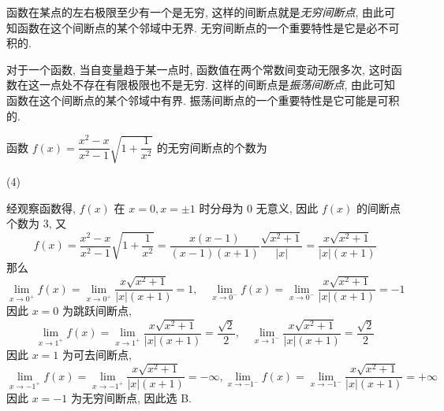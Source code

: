 \begin{definition}[无穷间断点]
    函数在某点的左右极限至少有一个是无穷, 这样的间断点就是\textit{无穷间断点}, 由此可知函数在这个间断点的某个邻域中无界. 无穷间断点的一个重要特性是它是必不可积的.
\end{definition}

\begin{definition}[振荡间断点]
    对于一个函数, 当自变量趋于某一点时, 函数值在两个常数间变动无限多次, 这时函数在这一点处不存在有限极限也不是无穷.
    这样的间断点是\textit{振荡间断点}, 由此可知函数在这个间断点的某个邻域中有界. 振荡间断点的一个重要特性是它可能是可积的.
\end{definition}

\begin{example}
    函数 $f(x)=\dfrac{x^2-x}{x^2-1}\sqrt{1+\dfrac{1}{x^2}}$ 的无穷间断点的个数为 
    \begin{tasks}(4)
    \end{tasks}
\end{example}
\begin{solution}
    经观察函数得, $f(x)$ 在 $x=0,x=\pm1$ 时分母为 $0$ 无意义, 因此 $f(x)$ 的间断点个数为 $3$, 又 
    $$
    f(x)=\dfrac{x^2-x}{x^2-1}\sqrt{1+\dfrac{1}{x^2}}=\dfrac{x(x-1)}{(x-1)(x+1)}\dfrac{\sqrt{x^2+1}}{|x|}=\dfrac{x\sqrt{x^2+1}}{|x|(x+1)}
    $$
    那么 $$
    \lim_{x \to 0^+}f(x)=\lim_{x \to 0^+}\dfrac{x\sqrt{x^2+1}}{|x|(x+1)}=1,\quad\lim_{x \to 0^-}f(x)=\lim_{x \to 0^-}\dfrac{x\sqrt{x^2+1}}{|x|(x+1)}=-1
    $$
    因此 $x=0$ 为跳跃间断点, 
    $$
    \lim_{x \to 1^+}f(x)=\lim_{x \to 1^+}\dfrac{x\sqrt{x^2+1}}{|x|(x+1)}=\dfrac{\sqrt{2}}{2},\quad\lim_{x \to 1^-}\dfrac{x\sqrt{x^2+1}}{|x|(x+1)}=\dfrac{\sqrt{2}}{2}
    $$
    因此 $x=1$ 为可去间断点,
    $$
    \lim_{x \to -1^+}f(x)=\lim_{x \to -1^+}\dfrac{x\sqrt{x^2+1}}{|x|(x+1)}=-\infty, \lim_{x \to -1^-}f(x)=\lim_{x \to -1^-}\dfrac{x\sqrt{x^2+1}}{|x|(x+1)}=+\infty
    $$
    因此 $x=-1$ 为无穷间断点, 因此选 B.
\end{solution}

